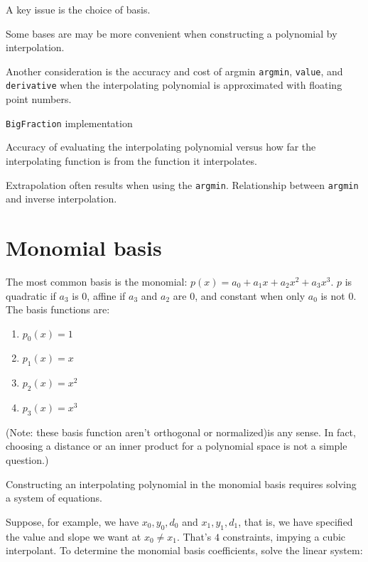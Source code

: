 A key issue is the choice of basis.

Some bases are may be more convenient when constructing a 
polynomial by interpolation.

Another consideration is the accuracy and cost of 
argmin \texttt{argmin}, \texttt{value}, and \texttt{derivative} 
when the interpolating polynomial is approximated with 
floating point numbers.

\texttt{BigFraction} implementation

Accuracy of evaluating the interpolating polynomial
versus how far the interpolating function is from the function it
interpolates.

Extrapolation often results when using the \texttt{argmin}.
Relationship between \texttt{argmin} and inverse interpolation.

\section{Monomial basis}\label{sec:monomial-basis}

The most common basis is the monomial:
$p(x) = a_0 + a_1 x + a_2 x^2 + a_3 x^3$.
$p$ is quadratic if $a_3$ is $0$,
affine if $a_3$ and $a_2$ are $0$,
and constant when only $a_0$ is not $0$.
The basis functions are:
\begin{enumerate}[start=0]
 \item $p_0(x) = 1$
 \item $p_1(x) = x$
 \item $p_2(x) = x^2$
 \item $p_3(x) = x^3$
\end{enumerate}

(Note: these basis function aren't orthogonal or normalized)is any
sense. In fact, choosing a distance or an inner product for
a polynomial space is not a simple question.)

Constructing an interpolating polynomial in the monomial basis
requires solving a system of equations.

Suppose, for example, we have $x_0,y_0,d_0$ and
$x_1,y_1,d_1$, that is, we have specified the value and slope we
want at $x_0 \neq x_1$.
That's $4$ constraints, impying a cubic interpolant.
To determine the monomial basis coefficients,
solve the linear system:

